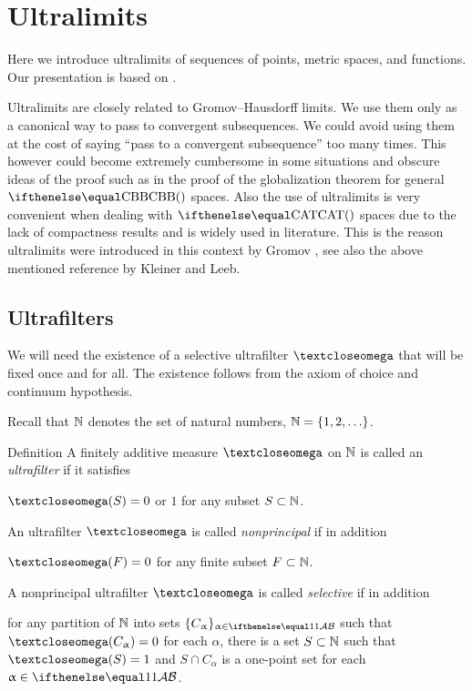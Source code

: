 \chapter{Ultralimits}

Here we introduce ultralimits of sequences of points, metric spaces, and functions.
Our presentation is based on \cite{kleiner-leeb}.

Ultralimits are closely related to Gromov--Hausdorff limits.
We use them only as a canonical way to pass to  convergent subsequences.
We could avoid using them at the cost of saying ``pass to a convergent subsequence'' too many times. This however could become extremely cumbersome in some situations and obscure ideas of the proof such as in the proof of the globalization theorem for general $\Alex{}$ spaces. Also the use of ultralimits is very convenient when dealing with $\CAT{}$ spaces due to the lack of compactness results and is widely used in literature.
  This is the reason  ultralimits  were introduced in  this context by Gromov \cite{gromov:asymt-inv}, see also the above mentioned reference by Kleiner and Leeb.


\section{Ultrafilters}

We will need the existence of a selective ultrafilter $\o$ that will be fixed once and  for all.
The existence follows from the axiom of choice and continuum hypothesis.

Recall that $\mathbb{N}$ denotes the set of natural numbers, $\NN=\{1,2,\dots\}$.

\begin{thm}{Definition}\label{def:ultrafilter}
A finitely additive measure $\o$ 
on  $\mathbb{N}$ 
is called an \emph{ultrafilter} if it satisfies 
\begin{subthm}{}
$\o(S)=0$ or $1$ for any subset $S\subset \NN$.
\end{subthm}
An ultrafilter $\o$ is called 
\emph{nonprincipal} if in addition 
\begin{subthm}{}
$\o(F)=0$ for any finite subset $F\subset \NN$.
\end{subthm}
A nonprincipal ultrafilter $\o$ is called 
\emph{selective} if in addition 
\begin{subthm}{}
for any partition of $\mathbb{N}$ into sets $\{C_\alpha\}_{\alpha\in\IndexSet}$ such that $\o(C_\alpha)\z=0$ for each $\alpha$, 
there is a set $S\subset \NN$ such that $\o(S)=1$ and $S\cap C_\alpha$ is a one-point set for each $\alpha\in\IndexSet$.
\end{subthm}
\end{thm}

